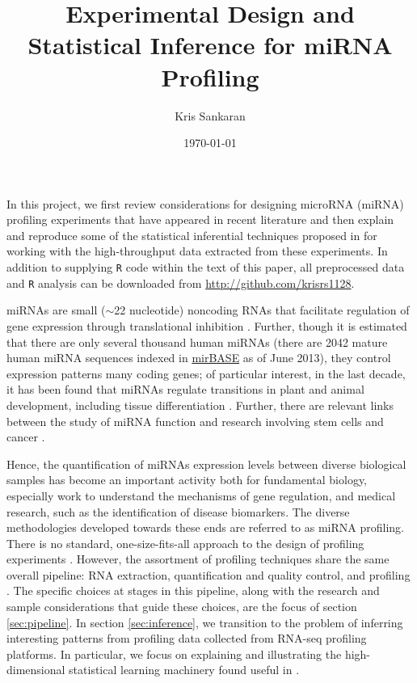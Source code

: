 \documentclass[12pt,english]{article}\usepackage{graphicx, color}
\author{Kris Sankaran}
\date{\today}
\title{Experimental Design and Statistical Inference for miRNA Profiling}
\numberwithin{equation}{section}
\numberwithin{figure}{section}
\theoremstyle{plain}
\theoremstyle{remark}
\begin{document}
\maketitle


\doublespace
In this project, we first review considerations for designing microRNA
(miRNA) profiling experiments that have appeared in recent literature
and then  explain and reproduce some of the statistical inferential
techniques proposed in \cite{witten2010ultra} for working with the
high-throughput data extracted from these experiments. In addition to
supplying \texttt{R} code within the text of this paper, all
preprocessed data and \texttt{R} analysis can be downloaded from
\href{http://github.com/krisrs1128}{http://github.com/krisrs1128}.

miRNAs are small ($\sim$22 nucleotide) noncoding RNAs that
facilitate regulation of gene expression through translational
inhibition \cite{kong2009strategies, pritchard2012microrna}. Further,
though it is estimated that there are only several thousand human
miRNAs (there are 2042 mature human miRNA sequences indexed in
\href{http://www.mirbase.org/cgi-bin/browse.pl?org=hsa}{mirBASE} as of
June 2013), they control expression patterns many coding genes; of
particular interest, in the last decade, it has been found
that miRNAs regulate transitions in plant and animal development,
including tissue differentiation \cite{ohnishi2010small,
  zhou2007mir, grosshans2005temporal}. Further, there are relevant
links between the study of miRNA function and research involving stem
cells and cancer \cite{alvarez2005microrna,   calin2006microrna,
  volinia2006microrna}.

Hence, the quantification of miRNAs expression levels between
diverse biological samples has become an important activity both for
fundamental biology, especially work to understand the mechanisms of
gene regulation, and medical research, such as the
identification of disease biomarkers. The diverse methodologies
developed towards these ends are referred to as miRNA profiling. There
is no standard, one-size-fits-all approach to the design of profiling
experiments \cite{kong2009strategies, pritchard2012microrna}. However, the
assortment of profiling techniques share the same overall pipeline:
RNA extraction, quantification and quality control, and profiling
\cite{pritchard2012microrna}. The specific choices at stages in this
pipeline, along with the research and sample considerations that guide
these choices, are the focus of section \ref{sec:pipeline}. In section
\ref{sec:inference}, we transition to the problem of inferring
interesting patterns from profiling data collected from RNA-seq
profiling platforms. In particular, we focus on explaining and
illustrating the high-dimensional statistical learning machinery found
useful in \cite{witten2010ultra}.
\end{document}
